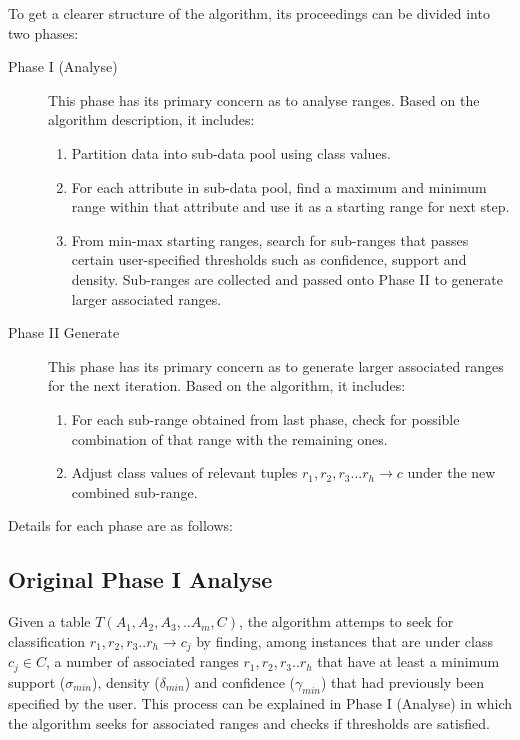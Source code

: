 To get a clearer structure of the algorithm, its proceedings can be divided into two phases:  

\begin{description}
\item[Phase I (Analyse)] 
This phase has its primary concern as to analyse ranges. Based on the algorithm description, it includes:
	\begin{enumerate}
	\item Partition data into sub-data pool using class values.
	\item For each attribute in sub-data pool, find a maximum and minimum range within that attribute and use it as a starting range for next step.
	\item From min-max starting ranges, search for sub-ranges that passes certain user-specified thresholds such as confidence, support and density. Sub-ranges are collected and passed onto Phase II to generate larger associated ranges.
	\end{enumerate}

\item[Phase II Generate] 
This phase has its primary concern as to generate larger associated ranges for the next iteration. Based on the algorithm, it includes:
	\begin{enumerate}
	\item For each sub-range obtained from last phase, check for possible combination of that range with the remaining ones.
	\item Adjust class values of relevant tuples $r_1, r_2, r_3...r_h \rightarrow c$ under the new combined sub-range.
	\end{enumerate}
\end{description}

Details for each phase are as follows:

\subsection{Original Phase I Analyse}

Given a table $T(A_1, A_2, A_3,..A_m, C)$, the algorithm attemps to seek for classification $r_1, r_2, r_3..r_h \rightarrow c_j$ by finding, among instances that are under class $c_j \in C$, a number of associated ranges $r_1, r_2, r_3..r_h$ that have at least a minimum support ($\sigma_{min}$), density ($\delta_{min}$) and confidence ($\gamma_{min}$) that had previously been specified by the user. This process can be explained in Phase I (Analyse) in which the algorithm seeks for associated ranges and checks if thresholds are satisfied. 

